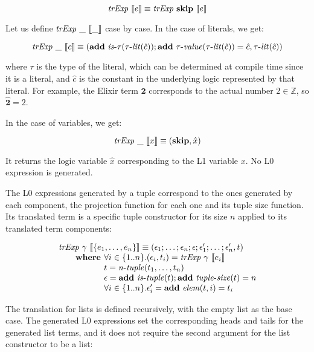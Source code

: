 \[
\mathit{trExp}~\llbracket e\rrbracket \equiv \mathit{trExp}~\textbf{skip}~\llbracket e\rrbracket
\]

Let us define $\mathit{trExp}~\_~\llbracket\_\rrbracket$ case by case. In the case of literals, we get:

\[
\mathit{trExp}~\_~\llbracket c\rrbracket \equiv (\textbf{add}~\mathit{is\mbox{-}\tau}(\mathit{\tau\mbox{-}lit}(\hat{c}));\textbf{add}~\mathit{\tau\mbox{-}value}(\mathit{\tau\mbox{-}lit}(\hat{c})) = \hat{c}, \mathit{\tau\mbox{-}lit}(\hat{c}))
\]

where $\tau$ is the type of the literal, which can be determined at compile time
since it is a literal, and $\hat{c}$ is the constant in the underlying logic
represented by that literal. For example, the Elixir term $\mathbf{2}$
corresponds to the actual number $2 \in \mathbb{Z}$, so $\hat{\mathbf{2}} = 2$.

In the case of variables, we get:

\[
\mathit{trExp}~\_~\llbracket x\rrbracket \equiv (\textbf{skip}, \hat{x})
\]

It returns the logic variable $\hat{x}$ corresponding to the L1 variable $x$. 
No L0 expression is generated.

The L0 expressions generated by a tuple correspond to the ones generated by each
component, the projection function for each one and its tuple size function. Its
translated term is a specific tuple constructor for its size $n$ applied to its 
translated term components:

\[
\begin{array}{l}
\trExp{\gamma}{\{e_1, \ldots, e_n\}} \equiv (\epsilon_1; \dots; \epsilon_n;\epsilon;\epsilon'_1; \dots; \epsilon'_n, t)\\
\qquad \textbf{where } \forall i \in \{1..n\}. (\epsilon_i, t_i) = \trExp{\gamma}{e_i}\\
\qquad \phantom{\textbf{where }} t = \mathit{n\mbox{-}tuple}(t_1, \ldots, t_n)\\
\qquad \phantom{\textbf{where }} \epsilon = \addE~\istuple{t};\addE~\mathit{tuple\mbox{-}size}(t) = n\\
\qquad \phantom{\textbf{where }} \forall i \in \{1..n\}. \epsilon'_i = \addE~\mathit{elem}(t, i) = t_i\\
\end{array}
\]

The translation for lists is defined recursively, with the empty list as the
base case. The generated L0 expressions set the corresponding heads and tails 
for the generated list terms, and it does not require the second argument for
the list constructor to be a list:

